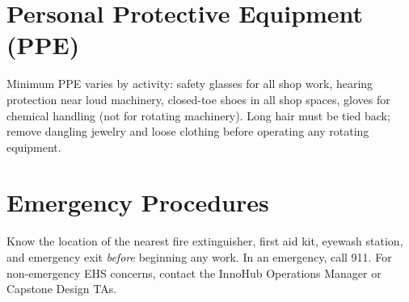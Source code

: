 \section*{Personal Protective Equipment (PPE)}
Minimum PPE varies by activity: safety glasses for all shop work, hearing protection near loud machinery, closed-toe shoes in all shop spaces, gloves for chemical handling (not for rotating machinery). Long hair must be tied back; remove dangling jewelry and loose clothing before operating any rotating equipment.

\section*{Emergency Procedures}
Know the location of the nearest fire extinguisher, first aid kit, eyewash station, and emergency exit \emph{before} beginning any work. In an emergency, call 911. For non-emergency EHS concerns, contact the InnoHub Operations Manager or Capstone Design TAs.


